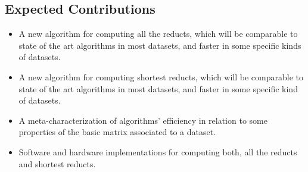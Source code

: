 \documentclass[authoryear,11pt]{elsarticle}
\begin{document}
\subsection{Expected Contributions}\label{Contributions} 
  \begin{itemize}
  \item A new algorithm for computing all the reducts, which will be comparable to 
  		state of the art algorithms in most datasets, and faster in some specific kinds of datasets.
  \item A new algorithm for computing shortest reducts, which will be comparable to 
  		state of the art algorithms in most datasets, and faster in some specific kind of datasets.
  \item A meta-characterization of algorithms' efficiency in relation to some properties of the
  		basic matrix associated to a dataset.
  \item Software and hardware implementations for computing both, all the reducts and shortest reducts.
  \end{itemize}
\end{document}
